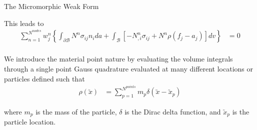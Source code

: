 \documentclass[11pt]{beamer}
\newcommand{\VEC}[1]{\utilde{#1}}
\begin{document}
\begin{frame}{The Micromorphic Weak Form}

This leads to
\begin{align*}
\sum_{n=1}^{N^{nodes}} w_j^n\left\{ \int_{\partial \mathcal{B}} N^n \sigma_{ij} n_i da + \int_{\mathcal{B}} \left[ - N_{,i}^{n} \sigma_{ij} + N^n \rho \left(f_j - a_j \right) \right] dv\right\} &= 0\\
\end{align*}

We introduce the material point nature by evaluating the volume integrals through a single point Gauss quadrature evaluated at many different locations or particles defined such that
\begin{align*}
\rho\left(\VEC{x}\right) &= \sum_{p=1}^{N^{points}} m_p \delta\left(\VEC{x}-\VEC{x}_p\right)
\end{align*}

where $m_p$ is the mass of the particle, $\delta$ is the Dirac delta function, and $\VEC{x}_p$ is the particle location.

\end{frame}
\end{document}
